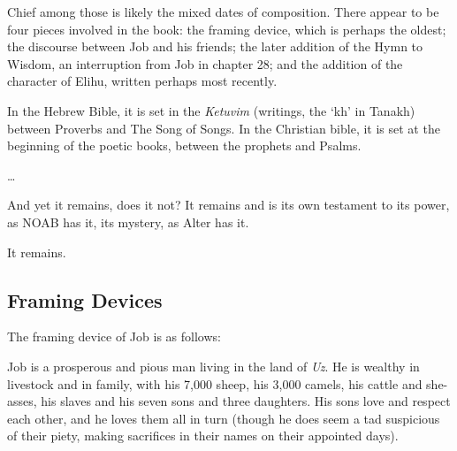 Chief among those is likely the mixed dates of composition. There appear to be four pieces involved in the book: the framing device, which is perhaps the oldest; the discourse between Job and his friends; the later addition of the Hymn to Wisdom, an interruption from Job in chapter 28; and the addition of the character of Elihu, written perhaps most recently.

In the Hebrew Bible, it is set in the \emph{Ketuvim} (writings, the `kh' in Tanakh) between Proverbs and The Song of Songs. In the Christian bible, it is set at the beginning of the poetic books, between the prophets and Psalms.

\ldots{}

And yet it remains, does it not? It remains and is its own testament to its power, as NOAB has it, its mystery, as Alter has it.

It remains.

\hypertarget{framing-devices}{%
\subsection*{Framing Devices}\label{framing-devices}}

The framing device of Job is as follows:

Job is a prosperous and pious man living in the land of \emph{Uz}. He is wealthy in livestock and in family, with his 7,000 sheep, his 3,000 camels, his cattle and she-asses, his slaves and his seven sons and three daughters. His sons love and respect each other, and he loves them all in turn (though he does seem a tad suspicious of their piety, making sacrifices in their names on their appointed days).

